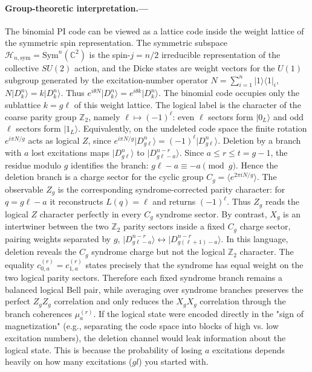 \documentclass[aps,prl,reprint,superscriptaddress,nofootinbib]{revtex4-2}
\newcommand{\ket}[1]{\lvert #1\rangle}
\begin{document}
\onecolumngrid
\paragraph*{Group-theoretic interpretation.---}
The binomial PI code can be viewed as a lattice code inside the weight
lattice of the symmetric spin representation.  The symmetric subspace
$\mathcal H_{n,\mathrm{sym}}=\mathrm{Sym}^n(\mathbb C^2)$ is the
spin-$j=n/2$ irreducible representation of the collective $SU(2)$ action,
and the Dicke states are weight vectors for the $U(1)$ subgroup generated by
the excitation-number operator $N=\sum_{i=1}^n |1\rangle\!\langle 1|_i$,
$N\ket{D_k^n}=k\ket{D_k^n}$. Thus $e^{i\theta N}\ket{D_k^n}=e^{i\theta k}\ket{D_k^n}$. The binomial code occupies only the sublattice $k=g\ell$ of this weight
lattice.  The logical label is the character of the coarse parity group
$\mathbb Z_2$, namely $\ell\mapsto (-1)^\ell$: even $\ell$ sectors form
$\ket{0_L}$ and odd $\ell$ sectors form $\ket{1_L}$.  Equivalently, on the
undeleted code space the finite rotation $e^{i\pi N/g}$ acts as logical
$Z$, since $e^{i\pi N/g}\ket{D_{g\ell}^n}=(-1)^\ell\ket{D_{g\ell}^n}$.
Deletion by a branch with $a$ lost excitations maps
$\ket{D_{g\ell}^n}$ to $\ket{D_{g\ell-a}^{n-r}}$.  Since
$a\le r\le t=g-1$, the residue modulo $g$ identifies the branch:
$g\ell-a\equiv -a \pmod g$.  Hence the deletion branch is a charge sector
for the cyclic group $C_g=\langle e^{2\pi iN/g}\rangle$.  The observable
$Z_g$ is the corresponding syndrome-corrected parity character: for
$q=g\ell-a$ it reconstructs $L(q)=\ell$ and returns $(-1)^\ell$.  Thus
$Z_g$ reads the logical $Z$ character perfectly in every $C_g$ syndrome
sector.  By contrast, $X_g$ is an intertwiner between the two
$\mathbb Z_2$ parity sectors inside a fixed $C_g$ charge sector, pairing
weights separated by $g$, $\ket{D_{g\ell-a}^{n-r}}
\longleftrightarrow
\ket{D_{g(\ell+1)-a}^{n-r}}$.
In this language, deletion reveals the $C_g$ syndrome charge but not the
logical $\mathbb Z_2$ character.  The equality
$c_{0,a}^{(r)}=c_{1,a}^{(r)}$ states precisely that the syndrome has equal
weight on the two logical parity sectors.  Therefore each fixed syndrome
branch remains a balanced logical Bell pair, while averaging over syndrome
branches preserves the perfect $Z_gZ_g$ correlation and only reduces the
$X_gX_g$ correlation through the branch coherences $\mu_a^{(r)}$.
%
If the logical state were encoded directly in the "sign of magnetization" (e.g., separating the code space into blocks of high vs. low excitation numbers), the deletion channel would leak information about the logical state. This is because the probability of losing $a$ excitations depends heavily on how many excitations ($gl$) you started with.  
\end{document}
